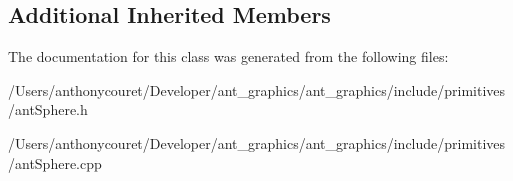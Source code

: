 \subsection*{Additional Inherited Members}


The documentation for this class was generated from the following files\+:\begin{DoxyCompactItemize}
\item 
/\+Users/anthonycouret/\+Developer/ant\+\_\+graphics/ant\+\_\+graphics/include/primitives/ant\+Sphere.\+h\item 
/\+Users/anthonycouret/\+Developer/ant\+\_\+graphics/ant\+\_\+graphics/include/primitives/ant\+Sphere.\+cpp\end{DoxyCompactItemize}
